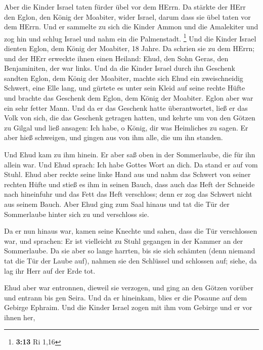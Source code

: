  Aber die Kinder Israel taten fürder übel vor dem HErrn.
Da stärkte der HErr den Eglon, den König der Moabiter, wider Israel,
darum dass sie übel taten vor dem HErrn.  Und er sammelte
zu sich die Kinder Ammon und die Amalekiter und zog hin und schlug
Israel und nahm ein die Palmenstadt. \footnote{\textbf{3:13} Ri 1,16}
 Und die Kinder Israel dienten Eglon, dem König der
Moabiter, 18 Jahre.  Da schrien sie zu dem HErrn; und der
HErr erweckte ihnen einen Heiland: Ehud, den Sohn Geras, den
Benjaminiten, der war links. Und da die Kinder Israel durch ihn Geschenk
sandten Eglon, dem König der Moabiter,  machte sich Ehud
ein zweischneidig Schwert, eine Elle lang, und gürtete es unter sein
Kleid auf seine rechte Hüfte  und brachte das Geschenk
dem Eglon, dem König der Moabiter. Eglon aber war ein sehr fetter Mann.
 Und da er das Geschenk hatte überantwortet, ließ er das
Volk von sich, die das Geschenk getragen hatten,  und
kehrte um von den Götzen zu Gilgal und ließ ansagen: Ich habe, o König,
dir was Heimliches zu sagen. Er aber hieß schweigen, und gingen aus von
ihm alle, die um ihn standen.

 Und Ehud kam zu ihm hinein. Er aber saß oben in der
Sommerlaube, die für ihn allein war. Und Ehud sprach: Ich habe Gottes
Wort an dich. Da stand er auf vom Stuhl.  Ehud aber
reckte seine linke Hand aus und nahm das Schwert von seiner rechten
Hüfte und stieß es ihm in seinen Bauch,  dass auch das
Heft der Schneide nach hineinfuhr und das Fett das Heft verschloss; denn
er zog das Schwert nicht aus seinem Bauch.  Aber Ehud
ging zum Saal hinaus und tat die Tür der Sommerlaube hinter sich zu und
verschloss sie.

 Da er nun hinaus war, kamen seine Knechte und sahen,
dass die Tür verschlossen war, und sprachen: Er ist vielleicht zu Stuhl
gegangen in der Kammer an der Sommerlaube.  Da sie aber
so lange harrten, bis sie sich schämten (denn niemand tat die Tür der
Laube auf), nahmen sie den Schlüssel und schlossen auf; siehe, da lag
ihr Herr auf der Erde tot.

 Ehud aber war entronnen, dieweil sie verzogen, und ging
an den Götzen vorüber und entrann bis gen Seira.  Und da
er hineinkam, blies er die Posaune auf dem Gebirge Ephraim. Und die
Kinder Israel zogen mit ihm vom Gebirge und er vor ihnen her,

